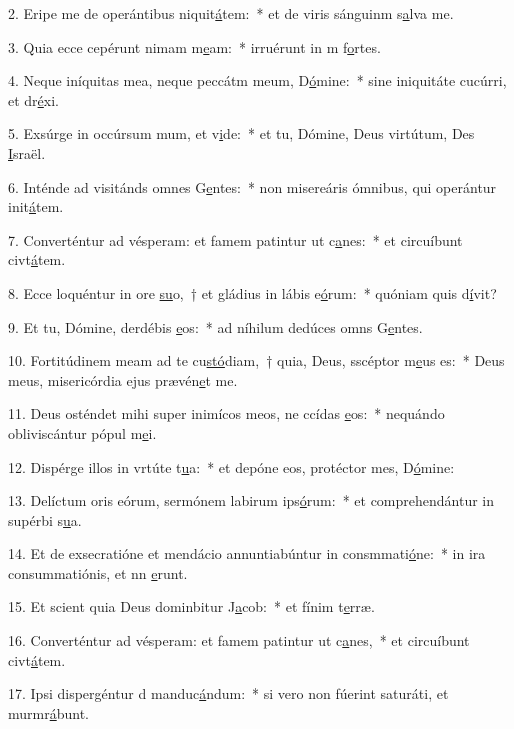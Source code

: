 2. Eripe me de operántibus niquit\uline{á}tem:~* et de viris sánguinm s\uline{a}lva me.\par 
3. Quia ecce cepérunt nimam m\uline{e}am:~* irruérunt in m f\uline{o}rtes.\par 
4. Neque iníquitas mea, neque peccátm meum, D\uline{ó}mine:~* sine iniquitáte cucúrri, et dr\uline{é}xi.\par 
5. Exsúrge in occúrsum mum, et v\uline{i}de:~* et tu, Dómine, Deus virtútum, Des \uline{I}sraël.\par 
6. Inténde ad visitánds omnes G\uline{e}ntes:~* non misereáris ómnibus, qui operántur init\uline{á}tem.\par 
7. Converténtur ad vésperam: et famem patintur ut c\uline{a}nes:~* et circuíbunt civt\uline{á}tem.\par 
8. Ecce loquéntur in ore \uline{su}o,~† et gládius in lábis e\uline{ó}rum:~* quóniam quis d\uline{í}vit?\par 
9. Et tu, Dómine, derdébis \uline{e}os:~* ad níhilum dedúces omns G\uline{e}ntes.\par 
10. Fortitúdinem meam ad te cu\uline{stó}diam,~† quia, Deus, sscéptor m\uline{e}us es:~* Deus meus, misericórdia ejus prævén\uline{e}t me.\par 
11. Deus osténdet mihi super inimícos meos, ne ccídas \uline{e}os:~* nequándo obliviscántur pópul m\uline{e}i.\par 
12. Dispérge illos in vrtúte t\uline{u}a:~* et depóne eos, protéctor mes, D\uline{ó}mine:\par 
13. Delíctum oris eórum, sermónem labirum ips\uline{ó}rum:~* et comprehendántur in supérbi s\uline{u}a.\par 
14. Et de exsecratióne et mendácio annuntiabúntur in consmmati\uline{ó}ne:~* in ira consummatiónis, et nn \uline{e}runt.\par 
15. Et scient quia Deus dominbitur J\uline{a}cob:~* et fínim t\uline{e}rræ.\par 
16. Converténtur ad vésperam: et famem patintur ut c\uline{a}nes,~* et circuíbunt civt\uline{á}tem.\par 
17. Ipsi dispergéntur d manduc\uline{á}ndum:~* si vero non fúerint saturáti, et murmr\uline{á}bunt.\par 
